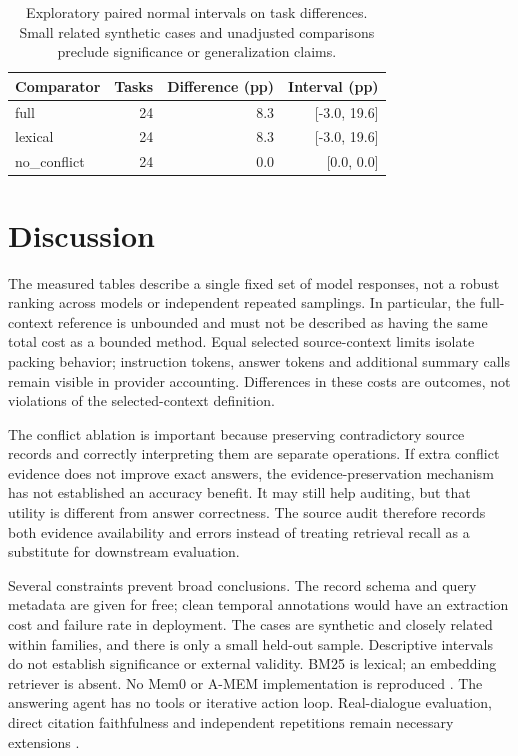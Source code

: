 \documentclass{article}
\begin{document}
\begin{table}[ht]\centering\small
\begin{tabular}{lrrr}\toprule
Comparator & Tasks & Difference (pp) & Interval (pp) \\ \midrule
full & 24 & 8.3 & [-3.0, 19.6] \\
lexical & 24 & 8.3 & [-3.0, 19.6] \\
no\_conflict & 24 & 0.0 & [0.0, 0.0] \\
\bottomrule\end{tabular}
\caption{Exploratory paired normal intervals on task differences. Small related synthetic cases and unadjusted comparisons preclude significance or generalization claims.}\end{table}
\section{Discussion}
The measured tables describe a single fixed set of model responses, not a robust ranking across models or independent repeated samplings. In particular, the full-context reference is unbounded and must not be described as having the same total cost as a bounded method. Equal selected source-context limits isolate packing behavior; instruction tokens, answer tokens and additional summary calls remain visible in provider accounting. Differences in these costs are outcomes, not violations of the selected-context definition.

The conflict ablation is important because preserving contradictory source records and correctly interpreting them are separate operations. If extra conflict evidence does not improve exact answers, the evidence-preservation mechanism has not established an accuracy benefit. It may still help auditing, but that utility is different from answer correctness. The source audit therefore records both evidence availability and errors instead of treating retrieval recall as a substitute for downstream evaluation.

Several constraints prevent broad conclusions. The record schema and query metadata are given for free; clean temporal annotations would have an extraction cost and failure rate in deployment. The cases are synthetic and closely related within families, and there is only a small held-out sample. Descriptive intervals do not establish significance or external validity. BM25 is lexical; an embedding retriever is absent. No Mem0 or A-MEM implementation is reproduced \citep{memzero,amem}. The answering agent has no tools or iterative action loop. Real-dialogue evaluation, direct citation faithfulness and independent repetitions remain necessary extensions \citep{longmemeval}.
\end{document}
